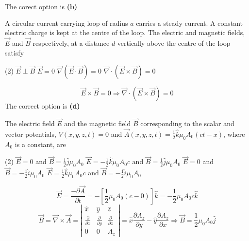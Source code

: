 \begin{enumerate}
\begin{answer}
$$	$$
	The corect option is \textbf{(b)}	
\end{answer}
\begin{minipage}{\textwidth}
	\item A circular current carrying loop of radius $a$ carries a steady current. A constant electric charge is kept at the centre of the loop. The electric and magnetic fields, $\vec{E}$ and $\vec{B}$ respectively, at a distance $d$ vertically above the centre of the loop satisfy
\end{minipage}
\begin{tasks}(2)
	\task[\textbf{A.}] $\vec{E} \perp \vec{B}$
	\task[\textbf{B.}]$\vec{E}=0$
	\task[\textbf{C.}]$\vec{\nabla}(\vec{E} \cdot \vec{B})=0$
	\task[\textbf{D.}]$\vec{\nabla} \cdot(\vec{E} \times \vec{B})=0$
\end{tasks}
\begin{answer}
	$$\vec{E} \times \vec{B}=0 \Rightarrow \vec{\nabla} \cdot(\vec{E} \times \vec{B})=0$$
	The correct option is \textbf{(d)}
\end{answer}
\begin{minipage}{\textwidth}
	\item The electric field $\vec{E}$ and the magnetic field $\vec{B}$ corresponding to the scalar and vector potentials, $V(x, y, z, t)=0$ and $\vec{A}(x, y, z, t)=\frac{1}{2} \hat{k} \mu_{0} A_{0}(c t-x)$, where $A_{0}$ is a constant, are
\end{minipage}
\begin{tasks}(2)
	\task[\textbf{A.}] $\vec{E}=0$ and $\vec{B}=\frac{1}{2} \hat{j} \mu_{0} A_{0}$
	\task[\textbf{B.}] $\vec{E}=-\frac{1}{2} \hat{k} \mu_{0} A_{0} c$ and $\vec{B}=\frac{1}{2} \hat{j} \mu_{0} A_{0}$
	\task[\textbf{C.}]$\vec{E}=0$ and $\vec{B}=-\frac{1}{2} \hat{i} \mu_{0} A_{0}$
	\task[\textbf{D.}]$\vec{E}=\frac{1}{2} \hat{k} \mu_{0} A_{0} c$ and $\vec{B}=-\frac{1}{2} \hat{i} \mu_{0} A_{0}$
\end{tasks}
\begin{answer}
	$$\vec{E}=\frac{-\partial \vec{A}}{\partial t}=-\left[\frac{1}{2} \mu_{0} A_{0}(c-0)\right] \hat{k}=-\frac{1}{2} \mu_{0} A_{0} c \hat{k}$$
	$$\vec{B}=\vec{\nabla} \times \vec{A}=\left|\begin{array}{ccc}
	\hat{x} & \hat{y} & \hat{z} \\
	\frac{\partial}{\partial x} & \frac{\partial}{\partial y} & \frac{\partial}{\partial z} \\
	0 & 0 & A_{z}
	\end{array}\right|=\hat{x} \frac{\partial A_{z}}{\partial y}-\hat{y} \frac{\partial A_{z}}{\partial x} \Rightarrow \vec{B}=\frac{1}{2} \mu_{0} A_{0} \hat{j}$$

\end{answer}
\end{enumerate}
